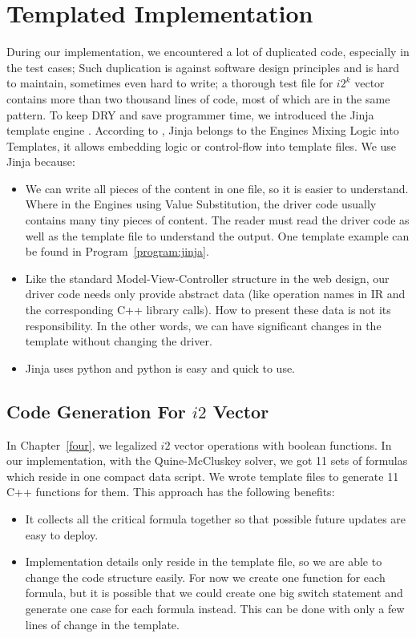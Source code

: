 \section{Templated Implementation}
During our implementation, we encountered a lot of duplicated code, especially in the test cases; Such duplication is against software design principles and is hard to maintain, sometimes even hard to write; a thorough test file for $i2^k$ vector contains more than two thousand lines of code, most of which are in the same pattern. To keep DRY and save programmer time, we introduced the Jinja template engine \cite{jinja_engine}. According to \cite{python_templating}, Jinja belongs to the Engines Mixing Logic into Templates, it allows embedding logic or control-flow into template files. We use Jinja because:

\begin{itemize}
    \item We can write all pieces of the content in one file, so it is easier to understand. Where in the Engines using Value Substitution, the driver code usually contains many tiny pieces of content. The reader must read the driver code as well as the template file to understand the output. One template example can be found in Program~\ref{program:jinja}.
    \item Like the standard Model-View-Controller structure in the web design, our driver code needs only provide abstract data (like operation names in IR and the corresponding C++ library calls). How to present these data is not its responsibility. In the other words, we can have significant changes in the template without changing the driver.
    \item Jinja uses python and python is easy and quick to use.
\end{itemize}

\subsection{Code Generation For $i2$ Vector}
In Chapter~\ref{four}, we legalized $i2$ vector operations with boolean functions. In our implementation, with the Quine-McCluskey solver, we got 11 sets of formulas which reside in one compact data script. We wrote template files to generate 11 C++ functions for them. This approach has the following benefits:
\begin{itemize}
    \item It collects all the critical formula together so that possible future updates are easy to deploy.
    \item Implementation details only reside in the template file, so we are able to change the code structure easily. For now we create one function for each formula, but it is possible that we could create one big switch statement and generate one case for each formula instead. This can be done with only a few lines of change in the template.
\end{itemize}

